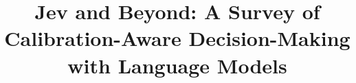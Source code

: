 \documentclass[acmsmall,screen,nonacm]{acmart}
\title[Jev and Beyond]{Jev and Beyond: A Survey of Calibration-Aware Decision-Making with Language Models}
\begin{document}
\clearpage
\renewcommand{\thetable}{A\arabic{table}}\setcounter{table}{0}
\label{lt:tableA1_p05:beg}

\label{lt:tableA1_p05:end}
\clearpage
\renewcommand{\thetable}{B\arabic{table}}\setcounter{table}{0}
\label{lt:tableB1_p05:beg}

\label{lt:tableB1_p05:end}
\clearpage
\renewcommand{\thetable}{C\arabic{table}}\setcounter{table}{0}
\label{lt:tableC1_p05:beg}

\label{lt:tableC1_p05:end}
\clearpage
\renewcommand{\thetable}{D\arabic{table}}\setcounter{table}{0}
\label{lt:tableD1_p05:beg}

\label{lt:tableD1_p05:end}
\clearpage
\renewcommand{\thetable}{F\arabic{table}}\setcounter{table}{0}
\label{lt:tableF1_p05:beg}

\label{lt:tableF1_p05:end}
\clearpage
\nocite{*}


\end{document}
